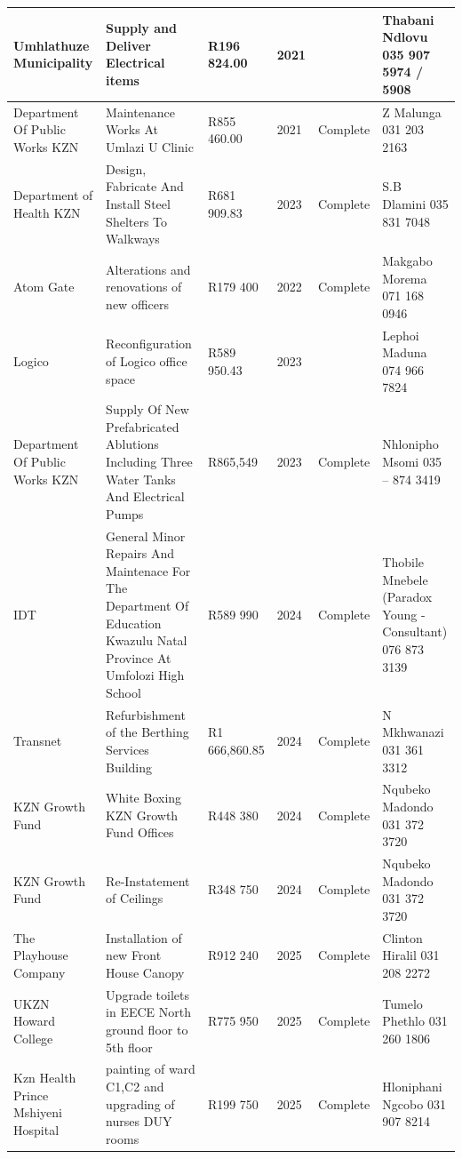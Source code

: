 \documentclass[a4paper,11pt]{article}
\begin{document}
{\begin{longtable}{@{} p{2.8cm} p{4.6cm} p{1.6cm} C{1.0cm} p{1.6cm} p{3.4cm} @{}}
  Umhlathuze Municipality & Supply and Deliver Electrical items & R196 824.00 & 2021 & & Thabani Ndlovu 035 907 5974 / 5908 \\
  \midrule
  Department Of Public Works KZN & Maintenance Works At Umlazi U Clinic & R855 460.00 & 2021 & Complete & Z Malunga 031 203 2163 \\
  \midrule
  Department of Health KZN & Design, Fabricate And Install Steel Shelters To Walkways & R681 909.83 & 2023 & Complete & S.B Dlamini 035 831 7048 \\
  \midrule
  Atom Gate & Alterations and renovations of new officers & R179 400 & 2022 & Complete & Makgabo Morema 071 168 0946 \\
  \midrule
  Logico & Reconfiguration of Logico office space & R589 950.43 & 2023 & & Lephoi Maduna 074 966 7824 \\
  \midrule
  Department Of Public Works KZN & Supply Of New Prefabricated Ablutions Including Three Water Tanks And Electrical Pumps & R865,549 & 2023 & Complete & Nhlonipho Msomi 035 – 874 3419 \\
  \midrule
  IDT & General Minor Repairs And Maintenace For The Department Of Education Kwazulu Natal Province At Umfolozi High School & R589 990 & 2024 & Complete & Thobile Mnebele (Paradox Young - Consultant) 076 873 3139 \\
  \midrule
  Transnet & Refurbishment of the Berthing Services Building & R1 666,860.85 & 2024 & Complete & N Mkhwanazi 031 361 3312 \\
  \midrule
  KZN Growth Fund & White Boxing KZN Growth Fund Offices & R448 380 & 2024 & Complete & Nqubeko Madondo 031 372 3720 \\
  \midrule
  KZN Growth Fund & Re-Instatement of Ceilings & R348 750 & 2024 & Complete & Nqubeko Madondo 031 372 3720 \\
  \midrule
  The Playhouse Company & Installation of new Front House Canopy & R912 240 & 2025 & Complete & Clinton Hiralil 031 208 2272 \\
  \midrule
  UKZN Howard College & Upgrade toilets in EECE North ground floor to 5th floor & R775 950 & 2025 & Complete & Tumelo Phethlo 031 260 1806 \\
  \midrule
  Kzn Health Prince Mshiyeni Hospital & painting of ward C1,C2 and upgrading of nurses DUY rooms & R199 750 & 2025 & Complete & Hloniphani Ngcobo 031 907 8214 \\

\end{longtable}}
\end{document}
